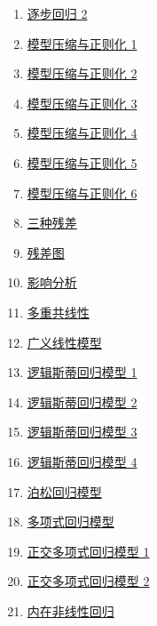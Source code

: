 \documentclass[11pt]{article}
\begin{document}
\begin{multicols}{2}
\begin{enumerate}
		\item \href{https://mp.weixin.qq.com/s/k-UdjNIAntNCnQCBYaWgCQ}{逐步回归 2}	%
		\item \href{https://mp.weixin.qq.com/s/lhyGgLbjmd--4X-J4rMe4Q}{模型压缩与正则化 1}	%
		\item \href{https://mp.weixin.qq.com/s/O-KMxreVxx7OEAaVaFrMAg}{模型压缩与正则化 2}	%
		\item \href{https://mp.weixin.qq.com/s/pl_eoALLNUltoGNxGjv38w}{模型压缩与正则化 3}	%
		\item \href{https://mp.weixin.qq.com/s/_W4T9qOylZ1Qq8ImrOL58Q}{模型压缩与正则化 4}	%
		\item \href{https://mp.weixin.qq.com/s/sta0rKuN8aupX-gXjwJfBQ}{模型压缩与正则化 5}	%
		\item \href{https://mp.weixin.qq.com/s/2TA5lBsmkHtes29GOtObfg}{模型压缩与正则化 6}	%
		\item \href{https://mp.weixin.qq.com/s/yDRxXuC64JzfgoMILCvO5w}{三种残差}	%
		\item \href{https://mp.weixin.qq.com/s/nruFdZy89bd1uSwsTa7JXg}{残差图}	%
		\item \href{https://mp.weixin.qq.com/s/d1WrIuYOYh3Mvzkq1-UIBw}{影响分析}	%
		\item \href{https://mp.weixin.qq.com/s/RP2Wnot9_BnXBGIVdiJGUQ}{多重共线性}	%
		\item \href{https://mp.weixin.qq.com/s/Cg1w67-FQTAqAcwVfNjskA}{广义线性模型}	%
		\item \href{https://mp.weixin.qq.com/s/67EixuRRg3X7_4v4e6DhvA}{逻辑斯蒂回归模型 1}	%
		\item \href{https://mp.weixin.qq.com/s/kBDgyrsKMa5w8MhjhAsHNg}{逻辑斯蒂回归模型 2}	%
		\item \href{https://mp.weixin.qq.com/s/D8K8AeB40YAmxQ5oejcq6w}{逻辑斯蒂回归模型 3}	%
		\item \href{https://mp.weixin.qq.com/s/6rN1NTl1cXg7x08RFozVnA}{逻辑斯蒂回归模型 4}	%
		\item \href{https://mp.weixin.qq.com/s/4Lt-tedS35UG218qU1Pkcg}{泊松回归模型}	%
		\item \href{https://mp.weixin.qq.com/s/PhASmnP01_iMkbbrfGMnMw}{多项式回归模型}	%
		\item \href{https://mp.weixin.qq.com/s/QmT0RzdDCd9JQJqXqfBgaw}{正交多项式回归模型 1}	%
		\item \href{https://mp.weixin.qq.com/s/XgcudheB53vRmQVo-vJA9A}{正交多项式回归模型 2}	%
		\item \href{https://mp.weixin.qq.com/s/9uvIzjvdgW6McDQce-DQOA}{内在非线性回归}	%

\end{enumerate}
\end{multicols}
\end{document}
